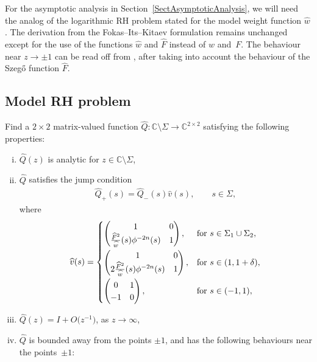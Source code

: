 \documentclass[11pt]{article}
\numberwithin{equation}{section}
\newcommand{\C}{\mathbb{C}}
\newcommand{\Id}{I}
\newcommand{\hw}{\widehat w}
\newcommand{\hQ}{{\widehat Q}}
\newcommand{\hv}{{\widehat v}}
\newcommand{\hF}{\widehat F}
\numberwithin{equation}{section}
\begin{document}
For the asymptotic analysis in Section~\ref{SectAsymptoticAnalysis}, we will need the analog of the logarithmic RH problem stated for the model weight function $\hw$. The derivation from the Fokas--Its--Kitaev formulation remains unchanged except for the use of the functions $\hw$ and $\hF$ instead of $w$ and~$F$. The behaviour near $z \to \pm1$ can be read off from \cite[Section~4]{KMVV}, after taking into account the behaviour of the Szeg\H{o} function $\hF$.

\subsection{Model RH problem}\label{ModRHP} Find a $2\times2$ matrix-valued function $\hQ \colon \C \setminus \Sigma \to \C^{2\times2}$ satisfying the following properties:
\begin{enumerate}[(i)]\itemsep=0pt
 \item $\hQ(z)$ is analytic for $z \in \C \setminus \Sigma$,
 \item $\hQ$ satisfies the jump condition
 \begin{align*}
 \hQ_+(s) = \hQ_-(s) \hv(s), \qquad s\in \Sigma,
 \end{align*}
 where
 \begin{align}\label{jumpMatrixhV}
\hv(s) =
\begin{cases}
\begin{pmatrix}
1 & 0
\\
\frac{\hF^2}{\hw}(s) \phi^{-2n}(s) & 1
\end{pmatrix}, & \mbox{for}\ s \in \Sigma_1 \cup \Sigma_2,\vspace{1mm}
\\
\begin{pmatrix}
1 & 0
\\
2\frac{\hF^2}{\hw}(s) \phi^{-2n}(s) & 1
\end{pmatrix}, & \mbox{for}\ s\in(1,1+\delta),\vspace{1mm}
\\
\begin{pmatrix}
0 & 1
\\
-1 & 0
\end{pmatrix}, &\mbox{for}\ s \in (-1,1),
\end{cases}
\end{align}
\item $\hQ(z) = \Id + O\big(z^{-1}\big)$, as $z \rightarrow \infty$,
\item $\hQ$ is bounded away from the points $\pm 1$, and has the following behaviours near the points~$\pm1$:

\end{enumerate}
\end{document}
